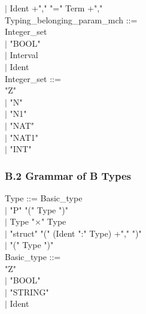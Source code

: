 \documentclass[12pt,a4paper,draft]{article}
\begin{document}
{\begin{sloppypar}
\hspace*{0.20in} $|$ Ident +","   "="  Term +","\\ 
Typing\_belonging\_param\_mch ::= \\ 
\hspace*{0.20in}   Integer\_set\\ 
\hspace*{0.20in} $|$ "BOOL" \\ 
\hspace*{0.20in} $|$  Interval\\ 
\hspace*{0.20in} $|$ Ident \\ 
Integer\_set ::= \\ 
\hspace*{0.20in}  "Z"\\ 
\hspace*{0.20in} $|$ "N" \\ 
\hspace*{0.20in} $|$ "N1" \\ 
\hspace*{0.20in} $|$ "NAT" \\ 
\hspace*{0.20in} $|$ "NAT1" \\ 
\hspace*{0.20in} $|$ "INT" \\ 
\end{sloppypar} 
}

\subsubsection{B.2 Grammar of B Types }
\footnotesize{
\begin{sloppypar} 

Type ::=  Basic\_type\\ 
 \hspace*{0.20in} $|$ "P"  "(" Type ")" \\ 
 \hspace*{0.20in} $|$  Type  "$\times$"  Type \\ 
\hspace*{0.20in} $|$ "struct" "(" (Ident ":" Type) +"," ")" \\ 
\hspace*{0.20in} $|$ "(" Type ")" \\ 
Basic\_type ::= \\ 
\hspace*{0.20in}  "Z" \\ 
\hspace*{0.20in} $|$ "BOOL"\\ 
\hspace*{0.20in} $|$ "STRING"\\ 
\hspace*{0.20in} $|$ Ident \\


\end{sloppypar} 
}
\end{document}
